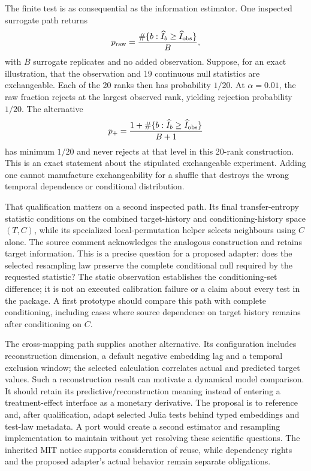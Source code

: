 The finite test is as consequential as the information estimator. One
inspected surrogate path returns
\[
 p_{\rm raw}=\frac{\#\{b:\widehat I_b\geq\widehat I_{\rm obs}\}}{B},
\]
with $B$ surrogate replicates and no added observation. Suppose, for an exact
illustration, that the observation and 19 continuous null statistics are
exchangeable. Each of the 20 ranks then has probability $1/20$. At
$\alpha=0.01$, the raw fraction rejects at the largest observed rank, yielding
rejection probability $1/20$. The alternative
\[
 p_+=\frac{1+\#\{b:\widehat I_b\geq\widehat I_{\rm obs}\}}{B+1}
\]
has minimum $1/20$ and never rejects at that level in this 20-rank construction.
This is an exact statement about the stipulated exchangeable experiment.
Adding one cannot manufacture exchangeability for a shuffle that destroys
the wrong temporal dependence or conditional distribution.
\citep{exec17_temporal_associations,exec17_temporal_oracle}

That qualification matters on a second inspected path. Its final
transfer-entropy statistic conditions on the combined target-history and
conditioning-history space $(T,C)$, while its specialized local-permutation
helper selects neighbours using $C$ alone. The source comment acknowledges
the analogous construction and retains target information. This is a precise
question for a proposed adapter: does the selected resampling law preserve
the complete conditional null required by the requested statistic?
The static observation establishes the conditioning-set difference; it is
not an executed calibration failure or a claim about every test in the
package. A first prototype should compare this path with complete
conditioning, including cases where source dependence on target history
remains after conditioning on $C$.
\citep{exec17_temporal_associations}

The cross-mapping path supplies another alternative. Its configuration
includes reconstruction dimension, a default negative embedding lag and a
temporal exclusion window; the selected calculation correlates actual and
predicted target values. Such a reconstruction result can motivate a dynamical
model comparison. It should retain its predictive/reconstruction meaning
instead of entering a treatment-effect interface as a monetary derivative.
The proposal is to reference and, after qualification, adapt selected Julia
tests behind typed embeddings and test-law metadata. A port would create a
second estimator and resampling implementation to maintain without yet
resolving these scientific questions. The inherited MIT notice supports
consideration of reuse, while dependency rights and the proposed adapter's
actual behavior remain separate obligations.
\citep{exec17_temporal_associations}

